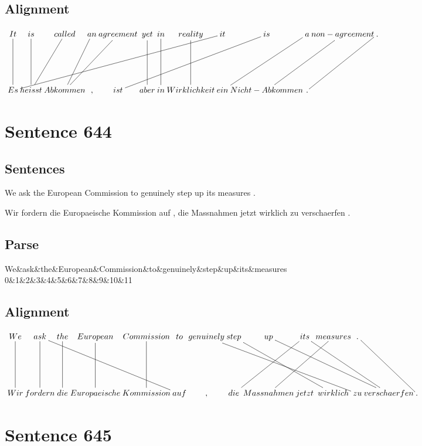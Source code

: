 \documentclass{report}
\begin{document}
\subsection*{Alignment}
\scriptsize{
$
\xymatrix@C-2.3pc{
It \ar @{-} [dd] & is \ar @{-} [dd] & called \ar @{-} [ddl] & an \ar @{-} [ddl] & agreement \ar @{-} [ddll] & yet \ar @{-} [dd] & in \ar @{-} [dd] & reality \ar @{-} [dd] & it \ar @{-} [ddllllllll] & is \ar @{-} [ddlllll] & a \ar @{-} [ddll] & non-agreement \ar @{-} [ddll] & . \ar @{-} [ddll]\\\\
Es & heisst & Abkommen & , & ist & aber & in & Wirklichkeit & ein & Nicht-Abkommen & .
}$}
\newpage\section*{Sentence 644}

\subsection*{Sentences}
We ask the European Commission to genuinely step up its measures .

\noindent Wir fordern die Europaeische Kommission auf , die Massnahmen jetzt wirklich zu verschaerfen .



\subsection*{Parse}
\begin{dependency}[theme=simple]
\begin{deptext}[column sep=.5cm, row sep=.1ex]
We\&ask\&the\&European\&Commission\&to\&genuinely\&step\&up\&its\&measures\\
0\&1\&2\&3\&4\&5\&6\&7\&8\&9\&10\&11\\
\end{deptext}
\end{dependency}


\subsection*{Alignment}
\scriptsize{
$
\xymatrix@C-2.3pc{
We \ar @{-} [dd] & ask \ar @{-} [ddrrrr] \ar @{-} [dd] & the \ar @{-} [dd] & European \ar @{-} [dd] & Commission \ar @{-} [dd] & to & genuinely \ar @{-} [ddrrrrr] & step \ar @{-} [ddrrr] & up \ar @{-} [ddrrrr] & its \ar @{-} [ddrrr] \ar @{-} [ddll] & measures \ar @{-} [ddll] & . \ar @{-} [ddrr]\\\\
Wir & fordern & die & Europaeische & Kommission & auf & , & die & Massnahmen & jetzt & wirklich & zu & verschaerfen & .
}$}
\newpage\section*{Sentence 645}
\end{document}
